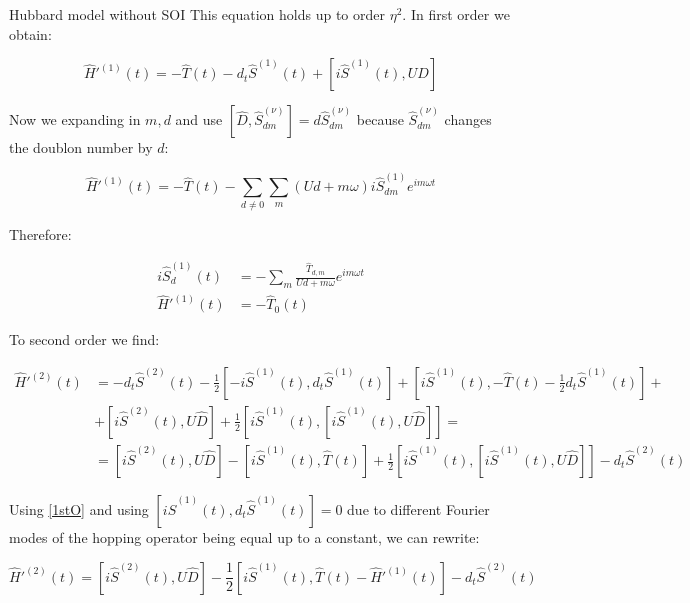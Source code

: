 \begin{section}{Hubbard model without SOI}
This equation holds up to order $\eta^2$. In first order we obtain:

\begin{equation}
\label{1stO}
\hat{H}'^{(1)}(t) = -\hat{T}(t) - d_t\hat{S}^{(1)}(t) + \left[ i\hat{S}^{(1)}(t), U\hat{D} \right]
\end{equation}

Now we expanding in $m,d$ and use $\left[ \hat{D}, \hat{S}^{(\nu)}_{dm} \right] = d\hat{S}^{(\nu)}_{dm}$ because $\hat{S}^{(\nu)}_{dm}$ changes the doublon number by $d$:

\begin{equation}
\hat{H}'^{(1)}(t)=-\hat{T}(t)-\sum_{d\neq 0}\sum_m (Ud+m\omega) i\hat{S}^{(1)}_{dm} e^{im\omega t}
\end{equation}

Therefore:

\begin{align}
i\hat{S}^{(1)}_d(t) &= -\sum_m \frac{\hat{T}_{d,m}}{Ud+m\omega}e^{im\omega t} \label{1stOSpin}\\
\hat{H}'^{(1)}(t) &= -\hat{T}_0(t) \label{1stOH}
\end{align}

To second order we find:

\begin{align}
\hat{H}'^{(2)}(t) &= - d_t\hat{S}^{(2)}(t) - \frac{1}{2}\left[-i\hat{S}^{(1)}(t), d_t\hat{S}^{(1)}(t) \right] + \left[i\hat{S}^{(1)}(t), -\hat{T}(t)-\frac{1}{2}d_t\hat{S}^{(1)}(t) \right] +\nonumber \\
&+ \left[i\hat{S}^{(2)}(t), U\hat{D} \right] + \frac{1}{2} \left[i\hat{S}^{(1)}(t), \left[i\hat{S}^{(1)}(t), U\hat{D} \right] \right] = \nonumber \\
&= \left[i\hat{S}^{(2)}(t), U \hat{D} \right] - \left[ i\hat{S}^{(1)}(t), \hat{T}(t) \right] + \frac{1}{2}\left[ i\hat{S}^{(1)}(t), \left[ i\hat{S}^{(1)}(t), U\hat{D} \right] \right] - d_t\hat{S}^{(2)}(t)
\end{align}

Using \ref{1stO} and using $\left[ i\hat{S}^{(1)}(t), d_t\hat{S}^{(1)}(t)\right] = 0$ due to different Fourier modes of the hopping operator being equal up to a constant, we can rewrite:

\begin{equation}
\hat{H}'^{(2)}(t) = \left[i\hat{S}^{(2)}(t), U \hat{D} \right] - \frac{1}{2}\left[ i\hat{S}^{(1)}(t), \hat{T}(t) - \hat{H}'^{(1)}(t)\right] - d_t\hat{S}^{(2)}(t)
\end{equation}


\end{section}

